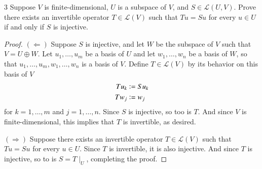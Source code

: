\documentclass{extarticle}
\newenvironment{problem}[1]{\begin{prob*}{#1}{}}{\end{prob*}}
\newcommand{\Hom}{\mathcal{L}}
\newcommand{\defeq}{\vcentcolon=}
\begin{document}
\begin{problem}{3}
Suppose $V$ is finite-dimensional, $U$ is a subspace of $V$, and $S\in\Hom(U,V)$.  Prove there exists an invertible operator $T\in\Hom(V)$ such that $Tu=Su$ for every $u\in U$ if and only if $S$ is injective.
\end{problem}
\begin{proof}
$(\Leftarrow)$ Suppose $S$ is injective, and let $W$ be the subspace of $V$ such that $V = U\oplus W$.  Let $u_1,\dots, u_m$ be a basis of $U$ and let $w_1,\dots, w_n$ be a basis of $W$, so that $u_1,\dots, u_m,w_1,\dots,w_n$ is a basis of $V$.  Define $T\in\Hom(V)$ by its behavior on this basis of $V$
\begin{align*}
Tu_k &\defeq Su_k\\
Tw_j &\defeq w_j
\end{align*}
for $k = 1,\dots, m$ and $j = 1,\dots, n$.  Since $S$ is injective, so too is $T$.  And since $V$ is finite-dimensional, this implies that $T$ is invertible, as desired.
\par $(\Rightarrow)$  Suppose there exists an invertible operator $T\in\Hom(V)$ such that $Tu=Su$ for every $u\in U$.  Since $T$ is invertible, it is also injective.  And since $T$ is injective, so to is $S = T\mid_U$, completing the proof.
\end{proof}
\end{document}
